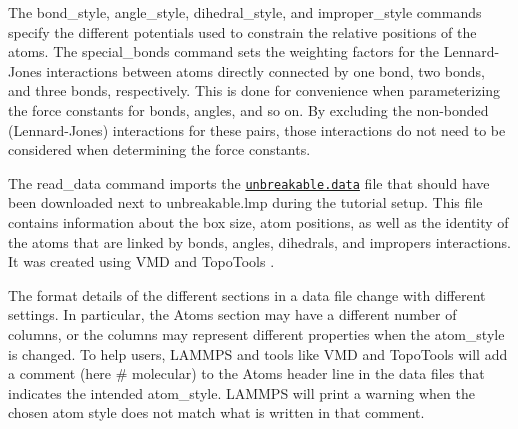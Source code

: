 \documentclass[9pt,tutorial]{livecoms}
\newcommand{\lmpcmd}[1]{\hspace{0pt}\colorbox{listing}{\textcolor{command}{\small{#1}}}\hspace{0pt}} %
\newcommand{\dwlcmd}[1]{\textcolor{download}{\texttt{#1}}} %
\newcommand{\filepath}{https://raw.githubusercontent.com/lammpstutorials/lammpstutorials-article/main/files/}
\begin{document}
The \lmpcmd{bond\_style}, \lmpcmd{angle\_style},
\lmpcmd{dihedral\_style}, and \lmpcmd{improper\_style} commands specify
the different potentials used to constrain the relative positions of the
atoms.  The \lmpcmd{special\_bonds} command sets the weighting factors
for the Lennard-Jones interactions between atoms directly connected by
one bond, two bonds, and three bonds, respectively.  This is done for
convenience when parameterizing the force constants for bonds, angles, and
so on.  By excluding the non-bonded (Lennard-Jones) interactions for
these pairs, those interactions do not need to be considered when determining
the force constants.

The \lmpcmd{read\_data} command imports the
\href{\filepath tutorial2/unbreakable.data}{\dwlcmd{unbreakable.data}}
file that should have been downloaded next
to \lmpcmd{unbreakable.lmp} during the tutorial setup. This file
contains information about the box size, atom positions, as well as the
identity of the atoms that are
linked by \lmpcmd{bonds}, \lmpcmd{angles}, \lmpcmd{dihedrals}, and
\lmpcmd{impropers} interactions. It was created using VMD and TopoTools
\cite{kohlmeyer2017topotools}.

\begin{note}
The format details of the
different sections in a data file change with different settings.  In
particular, the \lmpcmd{Atoms} section may have a different number of
columns, or the columns may represent different properties when the
\lmpcmd{atom\_style} is changed.  To help users, LAMMPS and tools like
VMD and TopoTools will add a comment (here \lmpcmd{\# molecular}) to the
\lmpcmd{Atoms} header line in the data files that indicates the intended
\lmpcmd{atom\_style}.  LAMMPS will print a warning when the chosen atom
style does not match what is written in that comment.
\end{note}
\end{document}
